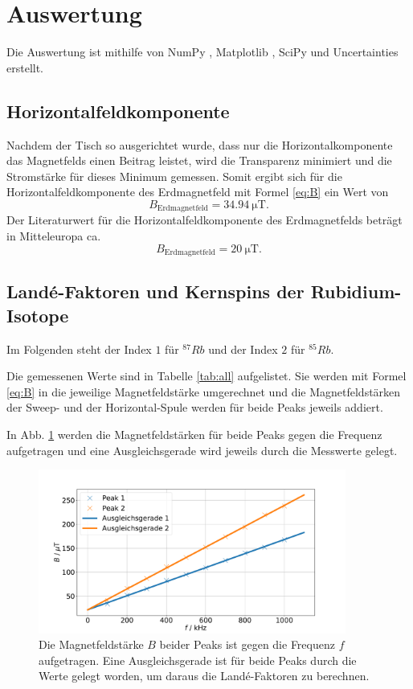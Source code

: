 \section{Auswertung}
\label{sec:Auswertung}

Die Auswertung ist mithilfe von NumPy \cite{numpy}, Matplotlib \cite{matplotlib}, SciPy \cite{scipy} und Uncertainties \cite{uncertainties} erstellt.

\subsection{Horizontalfeldkomponente}

Nachdem der Tisch so ausgerichtet wurde, dass nur die Horizontalkomponente das Magnetfelds einen Beitrag leistet, wird die Transparenz minimiert und die Stromstärke für dieses Minimum gemessen.
Somit ergibt sich für die Horizontalfeldkomponente des Erdmagnetfeld mit Formel \ref{eq:B} ein Wert von 
\begin{equation*}
    B_\text{Erdmagnetfeld} = \SI{34.94}{\micro\tesla}.
\end{equation*}
Der Literaturwert für die Horizontalfeldkomponente des Erdmagnetfelds beträgt in Mitteleuropa ca. 
\begin{equation*}
    B_\text{Erdmagnetfeld} = \SI{20}{\micro\tesla}.
\end{equation*}

\subsection{Landé-Faktoren und Kernspins der Rubidium-Isotope} 
Im Folgenden steht der Index $\num{1}$ für $^{87}Rb$ und der Index $\num{2}$ für $^{85}Rb$. %

Die gemessenen Werte sind in Tabelle \ref{tab:all}
aufgelistet. Sie werden mit Formel \eqref{eq:B} in die jeweilige Magnetfeldstärke umgerechnet und die Magnetfeldstärken der Sweep- und der Horizontal-Spule werden für beide Peaks jeweils addiert.

In Abb. \ref{fig:plot} werden die Magnetfeldstärken für beide Peaks gegen die Frequenz aufgetragen und eine Ausgleichsgerade wird jeweils durch die Messwerte gelegt. 
\begin{figure}
    \centering
    \includegraphics[width=0.9\textwidth]{plots/fits.pdf}
    \caption{Die Magnetfeldstärke $B$ beider Peaks ist gegen die Frequenz $f$ aufgetragen. Eine Ausgleichsgerade ist für beide Peaks durch die Werte gelegt worden, um daraus die Landé-Faktoren zu berechnen.}
    \label{fig:plot}
\end{figure}

